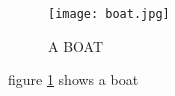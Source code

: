 \documentclass{article}
\begin{document}
\begin{figure}
\texttt{[image: boat.jpg]}
\caption{A BOAT}
\label{fig:boat1}
\end{figure}
figure \ref{fig:boat1} shows a boat
\end{document}
